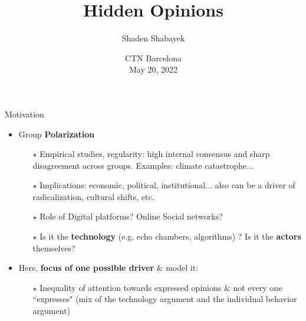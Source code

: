 \documentclass[xcolor=table,handout]{beamer}
\title[Hidden Opinions]{Hidden Opinions}
\author{Shaden Shabayek}
\institute{ Post-doctoral Researcher \\ Sciences Po Medialab}
\date{CTN Barcelona \\ May 20, 2022 }
\makeatletter
\newenvironment{backgroundblock}[2]{%
  \global\setbox\@backgroundblock=\vbox\bgroup%
    \unvbox\@backgroundblock%
    \vbox to0pt\bgroup\vskip#2\hbox to0pt\bgroup\hskip#1\relax%
}{\egroup\egroup\egroup}
\makeatother
\begin{document}
\begin{frame}[noframenumbering]

 \titlepage
 \thispagestyle{empty}
  

\end{frame}

\begin{frame}{Motivation}


\begin{itemize} \setlength\itemsep{1em}
	\item Group {\bf\color{purple}Polarization}   \smallskip 
	
		\begin{itemize} \setlength\itemsep{1em}
			\item[$\star$] Empirical studies, regularity: high internal consensus and sharp disagreement across groups. Examples: climate catastrophe... 
			\item[$\star$] Implications: economic, political, institutional... also can be a driver of radicalization, cultural shifts, etc. 
			\item[$\star$] Role  of Digital platforms? Online Social networks? 
			\item[$\star$] Is it the {\bf\color{purple}technology} (e.g. echo chambers, algorithms) ? Is it the {\bf\color{purple}actors} themselves? 
		\end{itemize}
	\item Here, {\bf\color{purple}focus of one possible driver} \& model it: 
		\begin{itemize} \setlength\itemsep{1em}
			\item[$\star$] Inequality of attention towards expressed opinions \& not every one ``expresses" (mix of the technology argument and the individual behavior argument)
		\end{itemize}
\end{itemize}
\end{frame}
\end{document}
